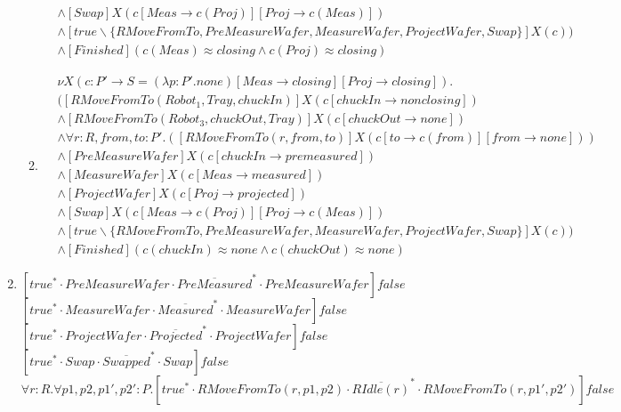 \begin{enumerate}
\begin{enumerate}
\begin{align*}
    	&\wedge [Swap]X(c[Meas \rightarrow c(Proj)][Proj \rightarrow c(Meas)])\\
    	&\wedge [true \backslash \{RMoveFromTo, PreMeasureWafer, MeasureWafer, ProjectWafer, Swap\}]X(c))\\
    	&\wedge [Finished](c(Meas)\approx closing \wedge c(Proj) \approx closing)
    	\end{align*}
    	\item
    	\begin{align*}
    	&\nu X(c:P'\rightarrow S = (\lambda p:P'.none)[Meas\rightarrow closing][Proj \rightarrow closing]).\\
    	&([RMoveFromTo(Robot_1, Tray, chuckIn)]X(c[chuckIn \rightarrow nonclosing])\\
    	&\wedge [RMoveFromTo(Robot_3, chuckOut, Tray)]X(c[chuckOut \rightarrow none])\\
    	&\wedge \forall r : R, from, to : P'.([RMoveFromTo(r, from, to)]X(c[to \rightarrow c(from)][from \rightarrow none]))\\
    	&\wedge [PreMeasureWafer]X(c[chuckIn \rightarrow premeasured])\\
    	&\wedge [MeasureWafer]X(c[Meas \rightarrow measured])\\
    	&\wedge [ProjectWafer]X(c[Proj \rightarrow projected])\\
    	&\wedge [Swap]X(c[Meas \rightarrow c(Proj)][Proj \rightarrow c(Meas)])\\
    	&\wedge [true \backslash \{RMoveFromTo, PreMeasureWafer, MeasureWafer, ProjectWafer, Swap\}]X(c))\\
    	&\wedge [Finished](c(chuckIn)\approx none \wedge c(chuckOut) \approx none)
    	\end{align*}
    \end{enumerate}
    \item 
	    $[true^{*}\cdot PreMeasureWafer \cdot \overline{PreMeasured}^{*} \cdot PreMeasureWafer]false$\\
	    $[true^{*}\cdot MeasureWafer \cdot \overline{Measured}^{*} \cdot MeasureWafer]false$\\
	    $[true^{*}\cdot ProjectWafer \cdot \overline{Projected}^{*} \cdot ProjectWafer]false$\\
	    $[true^{*}\cdot Swap \cdot \overline{Swapped}^{*} \cdot Swap]false$\\
	    $\forall r:R.\forall p1,p2,p1',p2':P.[true^{*}\cdot RMoveFromTo(r, p1, p2) \cdot \overline{RIdle(r)}^{*} \cdot RMoveFromTo(r, p1', p2')]false$\\

\end{enumerate}
